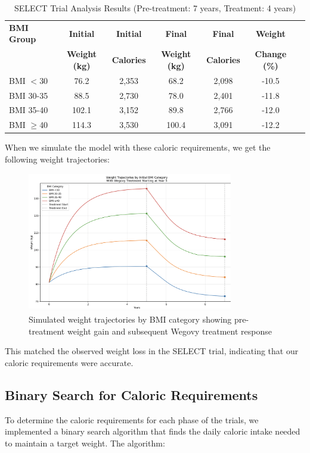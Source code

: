 \begin{table}[!htb]
\centering
\begin{tabular}{|l|c|c|c|c|c|c|}
\hline
\textbf{BMI Group} & \textbf{Initial} & \textbf{Initial} & \textbf{Final} & \textbf{Final} & \textbf{Weight} \\
& \textbf{Weight (kg)} & \textbf{Calories} & \textbf{Weight (kg)} & \textbf{Calories} & \textbf{Change (\%)} \\
\hline
BMI $<$30 & 76.2 & 2,353 & 68.2 & 2,098 & -10.5 \\
BMI 30-35 & 88.5 & 2,730 & 78.0 & 2,401 & -11.8 \\
BMI 35-40 & 102.1 & 3,152 & 89.8 & 2,766 & -12.0 \\
BMI $\geq$40 & 114.3 & 3,530 & 100.4 & 3,091 & -12.2 \\
\hline
\end{tabular}
\caption{SELECT Trial Analysis Results (Pre-treatment: 7 years, Treatment: 4 years)}
\end{table}

When we simulate the model with these caloric requirements, we get the following weight trajectories:

\begin{figure}[!htb]
\centering
\includegraphics[width=0.8\textwidth]{images/wegovy_weights_plot.png}
\caption{Simulated weight trajectories by BMI category showing pre-treatment weight gain and subsequent Wegovy treatment response}
\label{fig:wegovy_weights}
\end{figure}

This matched the observed weight loss in the SELECT trial, indicating that our caloric requirements were accurate.

\subsection{Binary Search for Caloric Requirements}
To determine the caloric requirements for each phase of the trials, we implemented a binary search algorithm that finds the daily caloric intake needed to maintain a target weight. The algorithm:

